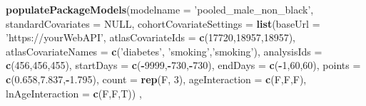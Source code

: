 \documentclass[
]{article}
\newenvironment{Shaded}{\begin{snugshade}}{\end{snugshade}}
\newcommand{\DataTypeTok}[1]{\textcolor[rgb]{0.13,0.29,0.53}{#1}}
\newcommand{\DecValTok}[1]{\textcolor[rgb]{0.00,0.00,0.81}{#1}}
\newcommand{\FloatTok}[1]{\textcolor[rgb]{0.00,0.00,0.81}{#1}}
\newcommand{\KeywordTok}[1]{\textcolor[rgb]{0.13,0.29,0.53}{\textbf{#1}}}
\newcommand{\NormalTok}[1]{#1}
\newcommand{\OperatorTok}[1]{\textcolor[rgb]{0.81,0.36,0.00}{\textbf{#1}}}
\newcommand{\OtherTok}[1]{\textcolor[rgb]{0.56,0.35,0.01}{#1}}
\newcommand{\StringTok}[1]{\textcolor[rgb]{0.31,0.60,0.02}{#1}}
\begin{document}
\begin{Shaded}
\begin{Highlighting}[]
\KeywordTok{populatePackageModels}\NormalTok{(}\DataTypeTok{modelname =} \StringTok{'pooled_male_non_black'}\NormalTok{,}
                      \DataTypeTok{standardCovariates =} \OtherTok{NULL}\NormalTok{,}
                      \DataTypeTok{cohortCovariateSettings =} \KeywordTok{list}\NormalTok{(}\DataTypeTok{baseUrl =} \StringTok{'https://yourWebAPI'}\NormalTok{,}
                                                     \DataTypeTok{atlasCovariateIds =} \KeywordTok{c}\NormalTok{(}\DecValTok{17720}\NormalTok{,}\DecValTok{18957}\NormalTok{,}\DecValTok{18957}\NormalTok{),}
                                                     \DataTypeTok{atlasCovariateNames =} \KeywordTok{c}\NormalTok{(}\StringTok{'diabetes'}\NormalTok{, }\StringTok{'smoking'}\NormalTok{,}\StringTok{'smoking'}\NormalTok{),}
                                                     \DataTypeTok{analysisIds =} \KeywordTok{c}\NormalTok{(}\DecValTok{456}\NormalTok{,}\DecValTok{456}\NormalTok{,}\DecValTok{455}\NormalTok{),}
                                                     \DataTypeTok{startDays =} \KeywordTok{c}\NormalTok{(}\OperatorTok{-}\DecValTok{9999}\NormalTok{,}\OperatorTok{-}\DecValTok{730}\NormalTok{,}\OperatorTok{-}\DecValTok{730}\NormalTok{),}
                                                     \DataTypeTok{endDays =} \KeywordTok{c}\NormalTok{(}\OperatorTok{-}\DecValTok{1}\NormalTok{,}\DecValTok{60}\NormalTok{,}\DecValTok{60}\NormalTok{),}
                                                     \DataTypeTok{points =} \KeywordTok{c}\NormalTok{(}\FloatTok{0.658}\NormalTok{,}\FloatTok{7.837}\NormalTok{,}\OperatorTok{-}\FloatTok{1.795}\NormalTok{),}
                                                     \DataTypeTok{count =} \KeywordTok{rep}\NormalTok{(F, }\DecValTok{3}\NormalTok{),}
                                                     \DataTypeTok{ageInteraction =} \KeywordTok{c}\NormalTok{(F,F,F), }
                                                     \DataTypeTok{lnAgeInteraction =} \KeywordTok{c}\NormalTok{(F,F,T)) ,}
                      

\end{Highlighting}
\end{Shaded}
\end{document}

